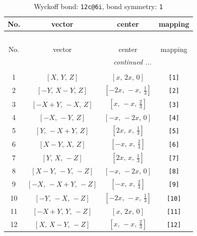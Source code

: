 \documentclass[fleqn,8pt]{jsarticle}
\begin{document}
\begin{longtable}{cccc}
\caption{Wyckoff bond: {\tt 12c@6i}, bond symmetry: {\tt 1}}
 \\
 \hline \hline
No. & vector & center & mapping \\ \hline \endfirsthead

\multicolumn{3}{l}{\tablename\ \thetable{}} \\
 \hline \hline
No. & vector & center & mapping \\ \hline \endhead

 \hline \hline
\multicolumn{3}{r}{\footnotesize\it continued ...} \\ \endfoot

 \hline \hline
\multicolumn{3}{r}{} \\ \endlastfoot

1 & $\left[ X,\, Y,\, Z \right]$ & $\left[ x,\, 2 x,\, 0 \right]$ & {\tt [1]} \\ \hline
2 & $\left[ - Y,\, X - Y,\, Z \right]$ & $\left[ - 2 x,\, - x,\, \frac{1}{3} \right]$ & {\tt [2]} \\ \hline
3 & $\left[ - X + Y,\, - X,\, Z \right]$ & $\left[ x,\, - x,\, \frac{2}{3} \right]$ & {\tt [3]} \\ \hline
4 & $\left[ - X,\, - Y,\, Z \right]$ & $\left[ - x,\, - 2 x,\, 0 \right]$ & {\tt [4]} \\ \hline
5 & $\left[ Y,\, - X + Y,\, Z \right]$ & $\left[ 2 x,\, x,\, \frac{1}{3} \right]$ & {\tt [5]} \\ \hline
6 & $\left[ X - Y,\, X,\, Z \right]$ & $\left[ - x,\, x,\, \frac{2}{3} \right]$ & {\tt [6]} \\ \hline
7 & $\left[ Y,\, X,\, - Z \right]$ & $\left[ 2 x,\, x,\, \frac{1}{3} \right]$ & {\tt [7]} \\ \hline
8 & $\left[ X - Y,\, - Y,\, - Z \right]$ & $\left[ - x,\, - 2 x,\, 0 \right]$ & {\tt [8]} \\ \hline
9 & $\left[ - X,\, - X + Y,\, - Z \right]$ & $\left[ - x,\, x,\, \frac{2}{3} \right]$ & {\tt [9]} \\ \hline
10 & $\left[ - Y,\, - X,\, - Z \right]$ & $\left[ - 2 x,\, - x,\, \frac{1}{3} \right]$ & {\tt [10]} \\ \hline
11 & $\left[ - X + Y,\, Y,\, - Z \right]$ & $\left[ x,\, 2 x,\, 0 \right]$ & {\tt [11]} \\ \hline
12 & $\left[ X,\, X - Y,\, - Z \right]$ & $\left[ x,\, - x,\, \frac{2}{3} \right]$ & {\tt [12]} \\
\end{longtable}
\end{document}
